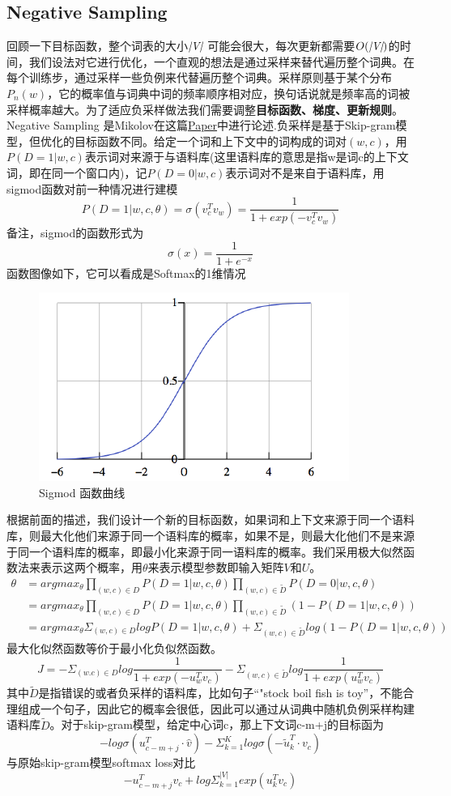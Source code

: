 \documentclass[twoside,nofonts,fancyhdr,openany,UTF8]{ctexbook}
\begin{document}
\subsection{Negative Sampling}
回顾一下目标函数，整个词表的大小$\emph{|V|}$ 可能会很大，每次更新都需要$O(\emph{|V|})$的时间，我们设法对它进行优化，一个直观的想法是通过采样来替代遍历整个词典。在每个训练步，通过采样一些负例来代替遍历整个词典。采样原则基于某个分布$P_{n}(w)$，它的概率值与词典中词的频率顺序相对应，换句话说就是频率高的词被采样概率越大。为了适应负采样做法我们需要调整\textbf{目标函数、梯度、更新规则}。
Negative Sampling 是Mikolov在这篇\href{https://arxiv.org/abs/1310.4546}{Paper}中进行论述.负采样是基于Skip-gram模型，但优化的目标函数不同。给定一个词和上下文中的词构成的词对$(w,c)$，用$P(D=1|w,c)$表示词对来源于与语料库(这里语料库的意思是指w是词c的上下文词，即在同一个窗口内)，记$P(D=0|w,c)$表示词对不是来自于语料库，用sigmod函数对前一种情况进行建模
$$P(D=1|w,c,\theta)=\sigma{(v_{c}^{T}v_w)}=\frac{1}{1+exp(-v_{c}^{T}v_w)}$$
备注，sigmod的函数形式为
$$\sigma{(x)}=\frac{1}{1+e^{-x}}$$
函数图像如下，它可以看成是Softmax的1维情况
\begin{figure}
\centering
\includegraphics[scale=0.8]{sigmod}
\caption{Sigmod 函数曲线}
\end{figure}
根据前面的描述，我们设计一个新的目标函数，如果词和上下文来源于同一个语料库，则最大化他们来源于同一个语料库的概率，如果不是，则最大化他们不是来源于同一个语料库的概率，即最小化来源于同一语料库的概率。我们采用极大似然函数法来表示这两个概率，用$\theta$来表示模型参数即输入矩阵$V和U$。
\begin{align}
\theta &= argmax_{\theta}\prod_{(w,c) \in D}P(D=1|w,c,\theta)\prod_{(w,c) \in \widetilde{D}}P(D=0|w,c,\theta) \\
&= argmax_{\theta}\prod_{(w,c) \in D}P(D=1|w,c,\theta) \prod_{(w,c) \in \widetilde{D}}(1-P(D=1|w,c,\theta)) \\
&= argmax_{\theta}\Sigma_{(w,c) \in D}log P(D=1|w,c,\theta) + \Sigma_{(w,c) \in \widetilde{D}}log(1-P(D=1|w,c,\theta))
\end{align}
最大化似然函数等价于最小化负似然函数。
$$J = - \Sigma_{(w.c) \in D}log{\frac{1}{1+exp(-u_{w}^{T}v_c)}} - \Sigma_{(w,c) \in \widetilde{D}}log{\frac{1}{1+exp(u_{w}^Tv_c)}}$$
其中$\widetilde{D}$是指错误的或者负采样的语料库，比如句子“"stock boil fish is toy”，不能合理组成一个句子，因此它的概率会很低，因此可以通过从词典中随机负例采样构建语料库$\widetilde{D}$。对于skip-gram模型，给定中心词c，那上下文词c-m+j的目标函为
$$-log\sigma{(u_{c-m+j}^{T}\cdot{\widehat{v}})}-\Sigma_{k=1}^{K}log\sigma{(-\widetilde{u}_{k}^{T}\cdot{v_c})}$$
与原始skip-gram模型softmax loss对比
$$-u_{c-m+j}^{T}v_{c}+log\Sigma_{k=1}^{|V|}exp(u_{k}^{T}v_c)$$
\end{document}
